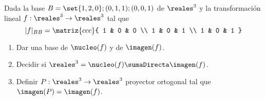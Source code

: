 \begin{enunciado}{\ejExtra}
  Dada la base $B = \set{1,2,0}; (0,1,1); (0,0,1)$ de $\reales^3$ y la transformación lineal
  $f: \reales^3 \to \reales^3$ tal que
  $$
    |f|_{BB} =
    \matriz{ccc}{
      1 & 0 & 0 \\
      1 & 0 & 1 \\
      1 & 0 & 1
    }
  $$
  \begin{enumerate}[label=\alph*)]
    \item Dar una base de $\nucleo(f)$ y de $\imagen(f)$.
    \item Decidir si $\reales^3 = \nucleo(f) \sumaDirecta \imagen(f)$.
    \item Definir $P: \reales^3 \to \reales^3$ proyector ortogonal tal que $\imagen(P) = \imagen(f)$.
  \end{enumerate}
\end{enunciado}

